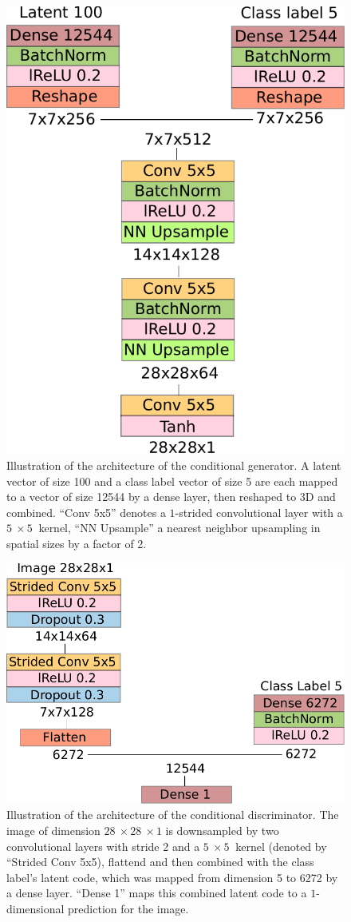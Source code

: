 \documentclass[10pt,conference,compsocconf]{IEEEtran}
\begin{document}
\begin{figure}
    \centering
    \includegraphics[width=0.58\columnwidth]{assets/cgen_arch.pdf}
    \caption{Illustration of the architecture of the conditional generator. A latent vector of size \SI{100}{} and a class label vector of size \SI{5}{} are each mapped to a vector of size \SI{12544}{} by a dense layer, then reshaped to 3D and combined. ``Conv 5x5'' denotes a $1$-strided convolutional layer with a $\SI{5}{}\times\SI{5}{}$ kernel, ``NN Upsample'' a nearest neighbor upsampling in spatial sizes by a factor of \SI{2}{}.}
    \label{fig:cgen_arch}
\end{figure}

\begin{figure}
    \centering
    \includegraphics[width=0.73\columnwidth]{assets/cdis_arch.pdf}
    \caption{Illustration of the architecture of the conditional discriminator. The image of dimension $\SI{28}{}\times\SI{28}{}\times1$ is downsampled by two convolutional layers with stride \SI{2}{} and a $\SI{5}{}\times\SI{5}{}$ kernel (denoted by ``Strided Conv 5x5), flattend and then combined with the class label's latent code, which was mapped from dimension \SI{5}{} to \SI{6272}{} by a dense layer. ``Dense 1'' maps this combined latent code to a $1$-dimensional prediction for the image.}
    \label{fig:cdis_arch}
\end{figure}
\end{document}
